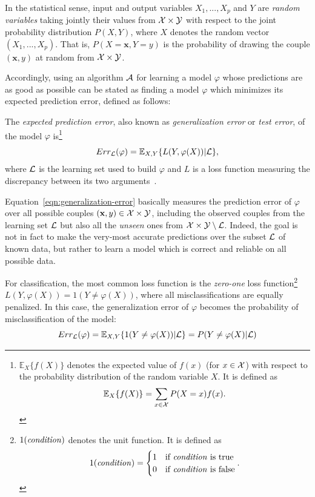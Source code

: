 In the statistical sense, input and output variables $X_1, ..., X_p$ and $Y$
are \textit{random variables} taking jointly their values from ${\cal X}
\times {\cal Y}$ with respect to the joint probability distribution $P(X, Y)$,
where $X$ denotes the random vector $(X_1, ..., X_p)$. That is,
$P(X=\mathbf{x}, Y=y)$ is the probability of drawing the couple $(\mathbf{x},
y)$ at random from ${\cal X} \times {\cal Y}$.

Accordingly, using an algorithm ${\cal A}$ for learning a model $\varphi$ whose
predictions are as good as possible can be stated as finding a model $\varphi$
which minimizes its expected prediction error, defined as follows:

\begin{definition}
The \emph{expected prediction error}, also known as \emph{generalization
error} or \emph{test error}, of the model $\varphi$ is\footnote{$\mathbb{E}_X \{f(X)\}$ denotes the expected value of $f(x)$
(for $x \in {\cal X}$) with respect to the probability distribution of the
random variable $X$. It is defined as $$\mathbb{E}_X \{f(X)\} = \sum_{x \in {\cal
X}} P(X=x) f(x).$$}
\begin{equation}\label{eqn:generalization-error}
Err_{{\cal L}}(\varphi) = \mathbb{E}_{X, Y}\{ L(Y, \varphi(X)) | {\cal L} \},
\end{equation}
where ${\cal L}$ is the learning set used to build $\varphi$ and $L$ is a loss
function measuring the discrepancy between its two
arguments~\citep{geurts:2002}.
\end{definition}

Equation~\ref{eqn:generalization-error} basically measures the prediction error of $\varphi$ over all
possible couples $(\mathbf{x}, y)\in {\cal X}\times{\cal Y}$, including the
observed couples from the learning set ${\cal L}$ but also all the
\textit{unseen} ones from ${\cal X}\times{\cal Y} \setminus {\cal L}$. Indeed,
the goal is not in fact to make the very-most accurate predictions over the
subset ${\cal L}$ of known data, but rather to learn a model which is correct
and reliable on all possible data.

For classification, the most common loss function is the \textit{zero-one} loss
function\footnote{$1(\text{\textit{condition}})$ denotes the unit function. It
is defined as
$$1(\text{\textit{condition}}) =
\begin{cases}
1 & \text{if \textit{condition} is true}\\
0 & \text{if \textit{condition} is false}
\end{cases}.
$$} $L(Y, \varphi(X)) = 1(Y \neq \varphi(X))$, where all
misclassifications are equally penalized. In this case, the generalization
error of $\varphi$ becomes the probability of misclassification of the model:
\begin{equation}
Err_{\cal L}(\varphi) = \mathbb{E}_{X, Y}\{ 1(Y \neq \varphi(X)) | {\cal L} \} = P(Y \neq \varphi(X)|{\cal L})
\end{equation}

